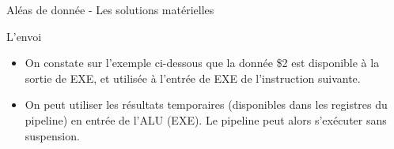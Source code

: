 %
\begin{Frame}{Aléas de donnée - Les solutions matérielles}

  \begin{block}{L'envoi}
       \begin{center}
 	\begin{itemize}
          \item On constate sur l'exemple ci-dessous que la donnée \$2 est disponible à la sortie de EXE, et utilisée à l'entrée de EXE de l'instruction suivante.
          \item On peut utiliser les résultats temporaires (disponibles dans les registres du pipeline) en entrée de l'ALU (EXE). Le pipeline peut alors s'exécuter sans suspension. 
        \end{itemize}
       \end{center}
      \end{block}   

\vspace{-0.8cm}
        \begin{center}
        \end{center}
 


\end{Frame}


